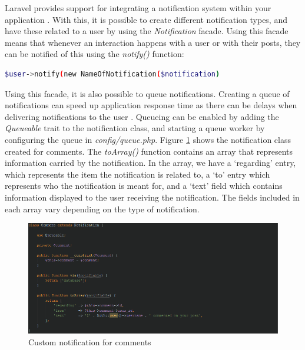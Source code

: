 Laravel provides support for integrating a notification system within your application \cite{Laravel:Notifications}. With this, it is possible to create different notification types, and have these related to a user by using the \textit{Notification} facade. Using this facade means that whenever an interaction happens with a user or with their posts, they can be notified of this using the \textit{notify()} function:

\begin{lstlisting}[language=bash]
    $user->notify(new NameOfNotification($notification)
\end{lstlisting}

Using this facade, it is also possible to queue notifications. Creating a queue of notifications can speed up application response time as there can be delays when delivering notifications to the user \cite{Laravel:Notifications, Laravel:Queues}. Queueing can be enabled by adding the \textit{Queueable} trait to the notification class, and starting a queue worker by configuring the queue in \textit{config/queue.php}. Figure \ref{fig:CommentNotification} shows the notification class created for comments. The \textit{toArray()} function contains an array that represents information carried by the notification. In the array, we have a `regarding' entry, which represents the item the notification is related to, a `to' entry which represents who the notification is meant for, and a `text' field which contains information displayed to the user receiving the notification. The fields included in each array vary depending on the type of notification.

\begin{figure}[H]
\centering
\includegraphics[width=\textwidth]{Images/Implementation/CommentNotification}
\caption{Custom notification for comments}
\label{fig:CommentNotification}
\end{figure}

